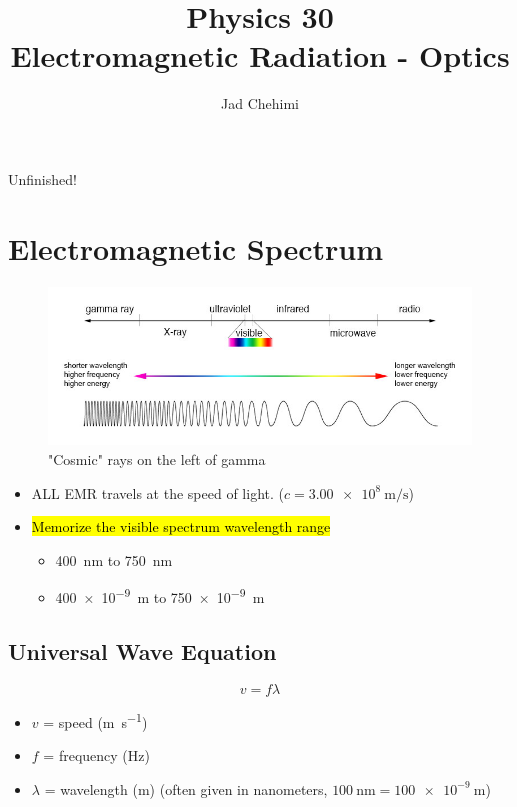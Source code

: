 \documentclass[a4paper,12pt]{article}
\title{Physics 30 \\ Electromagnetic Radiation - Optics}
\author{Jad Chehimi}
\begin{document}
\maketitle

\begin{center}
\Huge
Unfinished!
\normalsize
\end{center}

\tableofcontents

\pagebreak

\section{Electromagnetic Spectrum}
\begin{figure}[H]
    \centering
    \caption{"Cosmic" rays on the left of gamma}
    \includegraphics[width=\textwidth]{emr}
\end{figure}
\begin{itemize}
    \item{ALL EMR travels at the speed of light. ($c = \SI{3.00e8}{\m\per\s}$)}
    \item{
        \hl{Memorize the visible spectrum wavelength range}
        \begin{itemize}
            \item{\SI{400}{\nano\m} to \SI{750}{\nano\m}}
            \item{\SI{400e-9}{\m} to \SI{750e-9}{\m}}
        \end{itemize}
    }
\end{itemize}

\subsection{Universal Wave Equation}
\Large $$v = f\lambda$$ \normalsize
\begin{itemize}
    \item{$v$ = speed (\si{\m\per\s})}
    \item{$f$ = frequency (\si{\Hz})}
    \item{$\lambda$ = wavelength (\si{\m}) (often given in nanometers, $\SI{100}{\nano\m} = \SI{100e-9}{\m}$)}
\end{itemize}
\end{document}
